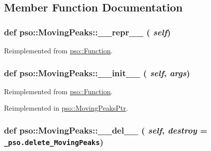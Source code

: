 \subsection{Member Function Documentation}
\hypertarget{classpso_1_1MovingPeaks_a49761a17dfa13ee9bd3854cae9b6db7}{
\subsubsection{\setlength{\rightskip}{0pt plus 5cm}def pso::MovingPeaks::\_\-\_\-repr\_\-\_\- ( {\em self})}}
\label{classpso_1_1MovingPeaks_a49761a17dfa13ee9bd3854cae9b6db7}




Reimplemented from \hyperlink{classpso_1_1Function_959f07a6de4f333461fdb0261e6c25ae}{pso::Function}.\hypertarget{classpso_1_1MovingPeaks_f48b3a4fe44b6a14626ea7c9dfaccd66}{
\subsubsection{\setlength{\rightskip}{0pt plus 5cm}def pso::MovingPeaks::\_\-\_\-init\_\-\_\- ( {\em self}, \/   {\em args})}}
\label{classpso_1_1MovingPeaks_f48b3a4fe44b6a14626ea7c9dfaccd66}




Reimplemented from \hyperlink{classpso_1_1Function_6874097c6476dc85af64b40e76a807e9}{pso::Function}.

Reimplemented in \hyperlink{classpso_1_1MovingPeaksPtr_32e785c6b0bffba8a0baee3920aa31eb}{pso::MovingPeaksPtr}.\hypertarget{classpso_1_1MovingPeaks_51bfd4ae5fc9d7b2f6ed4ebcc8f3470b}{
\subsubsection{\setlength{\rightskip}{0pt plus 5cm}def pso::MovingPeaks::\_\-\_\-del\_\-\_\- ( {\em self}, \/   {\em destroy} = {\tt \_\-pso.delete\_\-MovingPeaks})}}
\label{classpso_1_1MovingPeaks_51bfd4ae5fc9d7b2f6ed4ebcc8f3470b}




